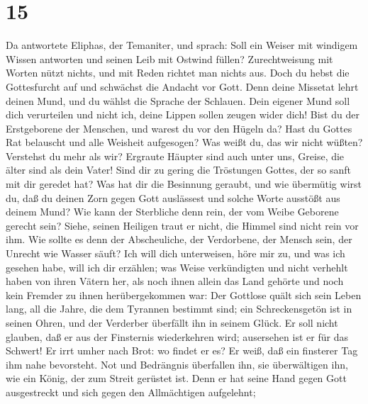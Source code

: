 \hypertarget{section-14}{%
\section{15}\label{section-14}}

 Da antwortete Eliphas, der Temaniter, und sprach:
 Soll ein Weiser mit windigem Wissen antworten und seinen
Leib mit Ostwind füllen?  Zurechtweisung mit Worten nützt
nichts, und mit Reden richtet man nichts aus.  Doch du
hebst die Gottesfurcht auf und schwächst die Andacht vor Gott.
 Denn deine Missetat lehrt deinen Mund, und du wählst die
Sprache der Schlauen.  Dein eigener Mund soll dich
verurteilen und nicht ich, deine Lippen sollen zeugen wider dich!
 Bist du der Erstgeborene der Menschen, und warest du vor
den Hügeln da?  Hast du Gottes Rat belauscht und alle
Weisheit aufgesogen?  Was weißt du, das wir nicht wüßten?
Verstehst du mehr als wir?  Ergraute Häupter sind auch
unter uns, Greise, die älter sind als dein Vater!  Sind
dir zu gering die Tröstungen Gottes, der so sanft mit dir geredet hat?
 Was hat dir die Besinnung geraubt, und wie übermütig
wirst du,  daß du deinen Zorn gegen Gott auslässest und
solche Worte ausstößt aus deinem Mund?  Wie kann der
Sterbliche denn rein, der vom Weibe Geborene gerecht sein?
 Siehe, seinen Heiligen traut er nicht, die Himmel sind
nicht rein vor ihm.  Wie sollte es denn der Abscheuliche,
der Verdorbene, der Mensch sein, der Unrecht wie Wasser säuft?
 Ich will dich unterweisen, höre mir zu, und was ich
gesehen habe, will ich dir erzählen;  was Weise
verkündigten und nicht verhehlt haben von ihren Vätern her,
 als noch ihnen allein das Land gehörte und noch kein
Fremder zu ihnen herübergekommen war:  Der Gottlose quält
sich sein Leben lang, all die Jahre, die dem Tyrannen bestimmt sind;
 ein Schreckensgetön ist in seinen Ohren, und der
Verderber überfällt ihn in seinem Glück.  Er soll nicht
glauben, daß er aus der Finsternis wiederkehren wird; ausersehen ist er
für das Schwert!  Er irrt umher nach Brot: wo findet er
es? Er weiß, daß ein finsterer Tag ihm nahe bevorsteht. 
Not und Bedrängnis überfallen ihn, sie überwältigen ihn, wie ein König,
der zum Streit gerüstet ist.  Denn er hat seine Hand
gegen Gott ausgestreckt und sich gegen den Allmächtigen aufgelehnt;
